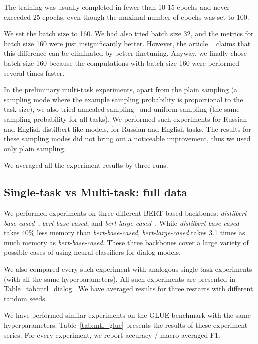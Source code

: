 The training was usually completed in fewer than 10-15 epochs and never exceeded 25 epochs, even though the maximal number of epochs was set to 100.

We set the batch size to 160. We had also tried batch size 32, and the metrics for batch size 160 were just insignificantly better. However, the article ~\cite{tuning_neural_networks} claims that this difference can be eliminated by better finetuning. Anyway, we finally chose batch size 160 because the computations with batch size 160 were performed several times faster.

In the preliminary multi-task experiments, apart from the plain sampling (a sampling mode where the example sampling probability is proportional to the task size), we also tried annealed sampling~\cite{PAL:19} and uniform sampling (the same sampling probability for all tasks). We performed such experiments for Russian and English distilbert-like models, for Russian and English tasks. The results for these sampling modes did not bring out a noticeable improvement, thus we used only plain sampling.

We averaged all the experiment results by three runs. %


\subsection{Single-task vs Multi-task: full data}

We performed experiments on three different BERT-based backbones: \textit{distilbert-base-cased}~\cite{alina}, \textit{bert-base-cased}, and \textit{bert-large-cased}~\cite{bert}. While \textit{distilbert-base-cased} takes 40\% less memory than \textit{bert-base-cased}, \textit{bert-large-cased} takes 3.1 times as much memory as \textit{bert-base-cased}. These three backbones cover a large variety of possible cases of using neural classifiers for dialog models. %

We also compared every such experiment with analogous single-task experiments (with all the same hyperparameters). All such experiments are presented in Table~\ref{tab:mtl_dialog}. We have averaged results for three restarts with different random seeds.

We have performed similar experiments on the GLUE benchmark with the same hyperparameters.
Table~\ref{tab:mtl_glue} presents the results of these experiment series. For every experiment, we report accuracy / macro-averaged F1.

